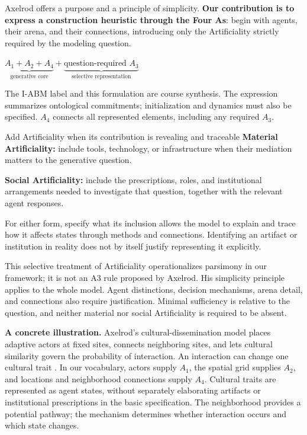 \documentclass[11pt,a4paper]{article}
\newenvironment{fitdisplay}{\par\medskip\noindent\begin{lrbox}{\displaybox}$\displaystyle}{%
$\end{lrbox}\makebox[\linewidth][c]{\ifdim\wd\displaybox>\linewidth\resizebox{\linewidth}{!}{\usebox{\displaybox}}\else\usebox{\displaybox}\fi}\par\medskip}
\begin{document}
Axelrod offers a purpose and a principle of simplicity. \textbf{Our contribution is to express a construction heuristic through the Four As}: begin with agents, their arena, and their connections, introducing only the Artificiality strictly required by the modeling question.

\begin{fitdisplay}
\boxed{\underbrace{A_1+A_2+A_4}_{\text{generative core}}+
\underbrace{\text{question-required }A_3}_{\text{selective representation}}}
\end{fitdisplay}

The I-ABM label and this formulation are course synthesis. The expression summarizes ontological commitments; initialization and dynamics must also be specified. $A_4$ connects all represented elements, including any required $A_3$.

\begin{principle}{Add Artificiality when its contribution is revealing and traceable}
\textbf{Material Artificiality:} include tools, technology, or infrastructure when their mediation matters to the generative question.

\textbf{Social Artificiality:} include the prescriptions, roles, and institutional arrangements needed to investigate that question, together with the relevant agent responses.

For either form, specify what its inclusion allows the model to explain and trace how it affects states through methods and connections. Identifying an artifact or institution in reality does not by itself justify representing it explicitly.
\end{principle}

This selective treatment of Artificiality operationalizes parsimony in our framework; it is not an A3 rule proposed by Axelrod. His simplicity principle applies to the whole model. Agent distinctions, decision mechanisms, arena detail, and connections also require justification. Minimal sufficiency is relative to the question, and neither material nor social Artificiality is required to be absent.

\textbf{A concrete illustration.} Axelrod's cultural-dissemination model places adaptive actors at fixed sites, connects neighboring sites, and lets cultural similarity govern the probability of interaction. An interaction can change one cultural trait \cite[pp.~207--208]{axelrod_dissemination_1997}. In our vocabulary, actors supply $A_1$, the spatial grid supplies $A_2$, and locations and neighborhood connections supply $A_4$. Cultural traits are represented as agent states, without separately elaborating artifacts or institutional prescriptions in the basic specification. The neighborhood provides a potential pathway; the mechanism determines whether interaction occurs and which state changes.
\end{document}
